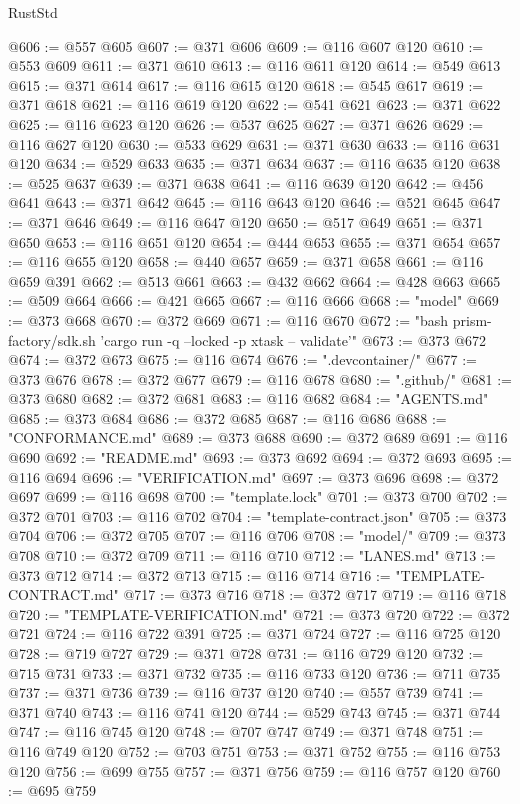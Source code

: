 \begin{lexlean}{RustStd}
\begin{coremodule}
@606 := @557 @605
@607 := @371 @606
@609 := @116 @607 @120
@610 := @553 @609
@611 := @371 @610
@613 := @116 @611 @120
@614 := @549 @613
@615 := @371 @614
@617 := @116 @615 @120
@618 := @545 @617
@619 := @371 @618
@621 := @116 @619 @120
@622 := @541 @621
@623 := @371 @622
@625 := @116 @623 @120
@626 := @537 @625
@627 := @371 @626
@629 := @116 @627 @120
@630 := @533 @629
@631 := @371 @630
@633 := @116 @631 @120
@634 := @529 @633
@635 := @371 @634
@637 := @116 @635 @120
@638 := @525 @637
@639 := @371 @638
@641 := @116 @639 @120
@642 := @456 @641
@643 := @371 @642
@645 := @116 @643 @120
@646 := @521 @645
@647 := @371 @646
@649 := @116 @647 @120
@650 := @517 @649
@651 := @371 @650
@653 := @116 @651 @120
@654 := @444 @653
@655 := @371 @654
@657 := @116 @655 @120
@658 := @440 @657
@659 := @371 @658
@661 := @116 @659 @391
@662 := @513 @661
@663 := @432 @662
@664 := @428 @663
@665 := @509 @664
@666 := @421 @665
@667 := @116 @666
@668 := "model"
@669 := @373 @668
@670 := @372 @669
@671 := @116 @670
@672 := "bash prism-factory/sdk.sh 'cargo run -q --locked -p xtask -- validate'"
@673 := @373 @672
@674 := @372 @673
@675 := @116 @674
@676 := ".devcontainer/"
@677 := @373 @676
@678 := @372 @677
@679 := @116 @678
@680 := ".github/"
@681 := @373 @680
@682 := @372 @681
@683 := @116 @682
@684 := "AGENTS.md"
@685 := @373 @684
@686 := @372 @685
@687 := @116 @686
@688 := "CONFORMANCE.md"
@689 := @373 @688
@690 := @372 @689
@691 := @116 @690
@692 := "README.md"
@693 := @373 @692
@694 := @372 @693
@695 := @116 @694
@696 := "VERIFICATION.md"
@697 := @373 @696
@698 := @372 @697
@699 := @116 @698
@700 := "template.lock"
@701 := @373 @700
@702 := @372 @701
@703 := @116 @702
@704 := "template-contract.json"
@705 := @373 @704
@706 := @372 @705
@707 := @116 @706
@708 := "model/"
@709 := @373 @708
@710 := @372 @709
@711 := @116 @710
@712 := "LANES.md"
@713 := @373 @712
@714 := @372 @713
@715 := @116 @714
@716 := "TEMPLATE-CONTRACT.md"
@717 := @373 @716
@718 := @372 @717
@719 := @116 @718
@720 := "TEMPLATE-VERIFICATION.md"
@721 := @373 @720
@722 := @372 @721
@724 := @116 @722 @391
@725 := @371 @724
@727 := @116 @725 @120
@728 := @719 @727
@729 := @371 @728
@731 := @116 @729 @120
@732 := @715 @731
@733 := @371 @732
@735 := @116 @733 @120
@736 := @711 @735
@737 := @371 @736
@739 := @116 @737 @120
@740 := @557 @739
@741 := @371 @740
@743 := @116 @741 @120
@744 := @529 @743
@745 := @371 @744
@747 := @116 @745 @120
@748 := @707 @747
@749 := @371 @748
@751 := @116 @749 @120
@752 := @703 @751
@753 := @371 @752
@755 := @116 @753 @120
@756 := @699 @755
@757 := @371 @756
@759 := @116 @757 @120
@760 := @695 @759

\end{coremodule}
\end{lexlean}
